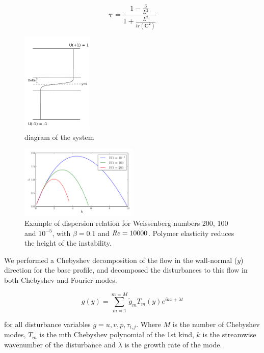 \documentclass{jfm}
\newcommand\Rey{\mbox{\textit{Re}}}  %
\begin{document}
\begin{equation}
    \mathbf{\tau} = \frac{1-\frac{3}{L^{2}}}{1 + \frac{L^{2}}{tr(\mathbf{C^{2}})}}
\end {equation}

\begin{figure}
    \centering
    \includegraphics[width=0.3\textwidth]{KH_diagram}
    \caption{diagram of the system}
    \label{fig:diagram}
\end{figure}

\begin{figure}
    \centering
    \includegraphics[width=0.5\textwidth]{KH_dispersion}
    \caption{Example of dispersion relation for Weissenberg numbers 200, 100 and $10^{-5}$, with $\beta = 0.1$ and $\Rey = 10000$. Polymer elasticity reduces the height of the instability.}
    \label{fig:KH_growth_rate}
\end{figure}

We performed a Chebyshev decomposition of the flow in the wall-normal ($y$) direction for the base profile, and decomposed the disturbances to this flow in both Chebyshev and Fourier modes.

\begin{equation}
    g(y) = \sum\limits_{m=1}^{m=M} \widetilde{g}_{m} T_{m}(y) e^{ikx + \lambda t}
\end{equation}

for all disturbance variables $g = u, v, p, \tau_{i,j}$. Where $M$ is the number of Chebyshev modes, $T_{m}$ is the mth Chebyshev polynomial of the 1st kind, $k$ is the streamwise wavenumber of the disturbance and $\lambda$ is the growth rate of the mode. 
\end{document}
